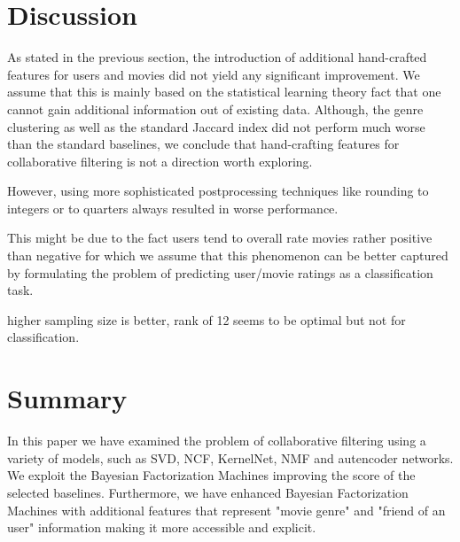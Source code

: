 \documentclass[10pt,conference,compsocconf]{IEEEtran}
\begin{document}
    \section{Discussion}
    As stated in the previous section, the introduction of additional hand-crafted features for users and movies did not yield any significant improvement.
    We assume that this is mainly based on the statistical learning theory fact that one cannot gain additional information out of existing data.
    Although, the genre clustering as well as the standard Jaccard index did not perform much worse than the standard baselines, we conclude that hand-crafting features for collaborative filtering is not a direction worth exploring.

    However, using more sophisticated postprocessing techniques like rounding to integers or to quarters always resulted in worse performance.

    This might be due to the fact users tend to overall rate movies rather positive than negative for which we assume that this phenomenon can be better captured by formulating the problem of predicting user/movie ratings as a classification task.


    higher sampling size is better, rank of 12 seems to be optimal but not for classification.


    \section{Summary}

    In this paper we have examined the problem of collaborative filtering using a variety of models, such as SVD, NCF, KernelNet, NMF and autencoder networks. We exploit the Bayesian Factorization Machines improving the score of the selected baselines. Furthermore, we have enhanced Bayesian Factorization Machines with additional features that represent "movie genre" and "friend of an user" information making it more accessible and explicit. 
    


    \balance
    
    
\end{document}
